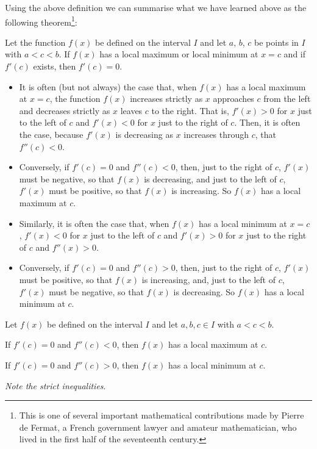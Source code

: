 Using the above definition we can summarise what we have learned above
as the following theorem\footnote{This is one of several important
mathematical contributions made by Pierre de Fermat, a French government
lawyer and amateur mathematician, who lived in the first half of
the seventeenth century. }:
\begin{theorem}\label{thm:APPlocalMaxMin}
Let the function $f(x)$ be defined on the interval $I$ and let $a$, $b$, $c$ be points in $I$ with $a<c<b$. If $f(x)$ has a local maximum or local minimum at $x=c$
and if $f'(c)$ exists, then $f'(c)=0$.
\end{theorem}

\begin{itemize}
\item
It is often (but not always) the case that, when $f(x)$ has a local maximum
at $x=c$, the function $f(x)$ increases strictly as $x$ approaches $c$ from the
left and decreases strictly as $x$ leaves $c$ to the right. That is,
$f'(x)>0$ for $x$ just to the left of $c$ and $f'(x)<0$ for $x$ just
to the right of $c$.
Then, it is often the case, because $f'(x)$ is decreasing as $x$ increases through $c$, that $f''(c)<0$.

\item
Conversely, if $f'(c)=0$ and $f''(c)<0$,
  then, just to the right of $c$, $f'(x)$ must be negative, so that
  $f(x)$ is decreasing, and  just to the left of $c$, $f'(x)$ must
  be positive, so that $f(x)$ is increasing.
  So $f(x)$ has a local maximum at $c$.

\item
 Similarly, it is often the case that, when $f(x)$ has a local minimum
 at $x=c$, $f'(x)<0$ for $x$ just to the left of $c$ and $f'(x)>0$ for
 $x$ just to the right of $c$ and $f''(x)>0$.

\item
Conversely, if $f'(c)=0$ and $f''(c)>0$,
  then, just to the right of $c$, $f'(x)$ must be positive, so that
  $f(x)$ is increasing, and, just to the left of $c$, $f'(x)$ must be
  negative, so that $f(x)$ is decreasing.
  So $f(x)$ has a local minimum at $c$.

\end{itemize}


\begin{theorem}\label{thm:APPsecondDerivTest}
Let $f(x)$ be defined on the interval $I$ and let $a, b, c\in I$ with $a<c<b$. 

If $f'(c)=0$ and $f''(c) <0$, then $f(x)$ has a local maximum at $c$.

If $f'(c)=0$ and $f''(c) >0$, then $f(x)$ has a local minimum at $c$.

\emph{Note the strict inequalities}.

\end{theorem}




